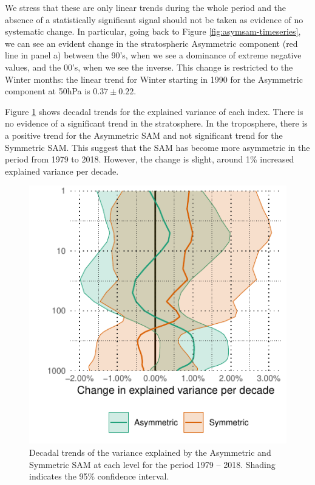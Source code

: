 \documentclass[]{ametsocV5}
\begin{document}
We stress that these are only linear trends during the whole period and the absence of a statistically significant signal should not be taken as evidence of no systematic change. In particular, going back to Figure \ref{fig:asymsam-timeseries}, we can see an evident change in the stratospheric Asymmetric component (red line in panel a) between the 90's, when we see a dominance of extreme negative values, and the 00's, when we see the inverse. This change is restricted to the Winter months: the linear trend for Winter starting in 1990 for the Asymmetric component at 50hPa is \(0.37 \pm 0.22\).

Figure \ref{fig:r-squared-trend} shows decadal trends for the explained variance of each index. There is no evidence of a significant trend in the stratosphere. In the troposphere, there is a positive trend for the Asymmetric SAM and not significant trend for the Symmetric SAM. This suggest that the SAM has become more asymmetric in the period from 1979 to 2018. However, the change is slight, around 1\% increased explained variance per decade.

\begin{figure}
\includegraphics{r-squared-trend-1} \caption[Decadal trends of the variance explained by the Asymmetric and Symmetric SAM at each level for the period 1979 -- 2018]{Decadal trends of the variance explained by the Asymmetric and Symmetric SAM at each level for the period 1979 -- 2018. Shading indicates the 95\% confidence interval.}\label{fig:r-squared-trend}
\end{figure}
\end{document}
